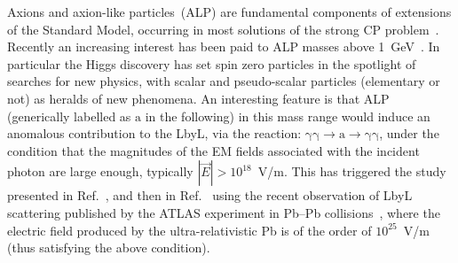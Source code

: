 Axions and axion-like particles~(ALP) are fundamental components of extensions of the Standard Model, occurring in most solutions of the strong CP problem~\cite{Peccei:1977hh,PhysRevLett.38.1440}. Recently an increasing interest has been paid to ALP masses
above 1~GeV~\cite{Bauer:2017ris,Mimasu:2014nea,Jaeckel:2015jla,Knapen:2016moh,Brivio:2017ije}. In particular the Higgs discovery has set spin zero particles in the spotlight of searches for new physics, with scalar and pseudo-scalar particles (elementary or not) as heralds of new phenomena. An interesting feature is that ALP (generically labelled as $\mathrm{a}$ in the following) in this mass range would induce an anomalous contribution to the LbyL, via the reaction:
$\mathrm{\gamma \gamma \rightarrow a \rightarrow \gamma \gamma}$,
under the condition that the magnitudes of the EM fields associated
with the incident photon are large enough, typically $|\vec{E}| >10^{18}$~V/m.
This has triggered  the study presented in Ref.~\cite{Knapen:2016moh},
and then in Ref.~\cite{Knapen:2017ebd} using the recent observation of LbyL scattering published by the ATLAS experiment in Pb--Pb collisions~\cite{Aaboud:2017bwk}, where the electric field produced by the ultra-relativistic Pb is of the order of $10^{25}$~V/m (thus satisfying the above condition).

